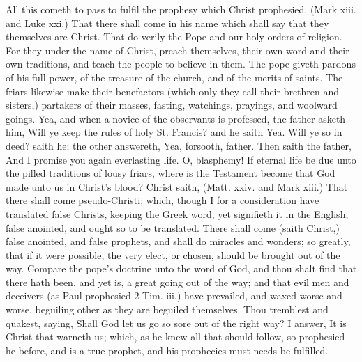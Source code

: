 All this cometh to pass to fulfil the prophesy which 
Christ prophesied. (Mark xiii. and Luke xxi.) That 
there shall come in his name which shall say that they 
themselves are Christ. That do verily the Pope and our 
holy orders of religion. For they under the name of Christ, 
preach themselves, their own word and their own traditions,
and teach the people to believe in them. The pope 
giveth pardons of his full power, of the treasure of the 
church, and of the merits of saints. The friars likewise 
make their benefactors (which only they call their brethren 
and sisters,) partakers of their masses, fasting, watchings, 
prayings, and woolward goings. Yea, and when a novice 
of the observants is professed, the father asketh him, 
Will ye keep the rules of holy St. Francis? and he saith 
Yea. Will ye so in deed? saith he; the other answereth, 
Yea, forsooth, father. Then saith the father, And I 
promise you again everlasting life. O, blasphemy! If 
eternal life be due unto the pilled traditions of lousy friars, 
where is the Testament become that God made unto us 
in Christ's blood? Christ saith, (Matt. xxiv. and Mark 
xiii.) That there shall come pseudo-Christi; which, 
though I for a consideration have translated false Christs, 
keeping the Greek word, yet signifieth it in the English, 
false anointed, and ought so to be translated. There 
shall come (saith Christ,) false anointed, and false prophets,
and shall do miracles and wonders; so greatly, that 
if it were possible, the very elect, or chosen, should be 
brought out of the way. Compare the pope's doctrine 
unto the word of God, and thou shalt find that there hath 
been, and yet is, a great going out of the way; and that 
evil men and deceivers (as Paul prophesied 2 Tim. iii.) 
have prevailed, and waxed worse and worse, beguiling 
other as they are beguiled themselves. Thou tremblest 
and quakest, saying, Shall God let us go so sore out of 
the right way? I answer, It is Christ that warneth us; 
which, as he knew all that should follow, so prophesied 
he before, and is a true prophet, and his prophecies must 
needs be fulfilled. 

